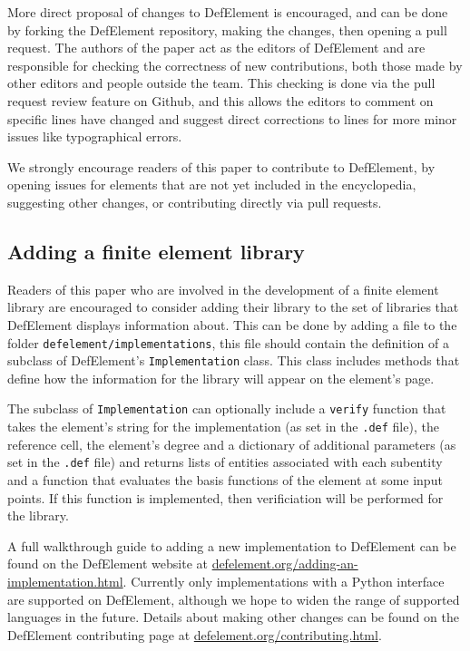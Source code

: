 \documentclass[sn-mathphys-num]{sn-jnl}%
\theoremstyle{thmstyleone}%
\theoremstyle{thmstyletwo}%
\theoremstyle{thmstylethree}%
\begin{document}
More direct proposal of changes to DefElement is encouraged, and can be done by forking the DefElement repository, making the changes, then opening a pull request.
The authors of the paper act as the editors of DefElement and are responsible for checking the correctness of new contributions, both those made by other
editors and people outside the team. This checking is done via the pull request review feature on Github, and this allows the editors to comment on specific lines
have changed and suggest direct corrections to lines for more minor issues like typographical errors.

We strongly encourage readers of this paper to contribute to DefElement, by
opening issues for elements that are not yet included in the encyclopedia,
suggesting other changes, or contributing directly via pull requests.

\subsection{Adding a finite element library}
Readers of this paper who are involved in the development of a finite element library
are encouraged to consider adding their library to the set of libraries that DefElement displays information about.
This can be done by adding a file to the folder \texttt{defelement/implementations},
this file should contain the definition of a subclass of DefElement's \texttt{Implementation} class.
This class includes methods that define how the information for the library will appear on the
element's page.

The subclass of \texttt{Implementation} can optionally include a \texttt{verify} function that
takes
the element's string for the implementation (as set in the \texttt{.def} file),
the reference cell,
the element's degree and
a dictionary of additional parameters (as set in the \texttt{.def} file)
and returns lists of entities associated with each subentity and a function that evaluates the basis functions of the element at some input points. If this function
is implemented, then verificiation will be performed for the library.

A full walkthrough guide to adding a new implementation to DefElement can be found on the DefElement
website at \href{https://defelement.org/adding-an-implementation.html}{defelement.org/adding-an-implementation.html}.
Currently only implementations with a Python interface are supported on DefElement, although we hope
to widen the range of supported languages in the future. Details about making other changes can be found on the
DefElement contributing page at \href{https://defelement.org/contributing.html}{defelement.org/contributing.html}.
\end{document}
